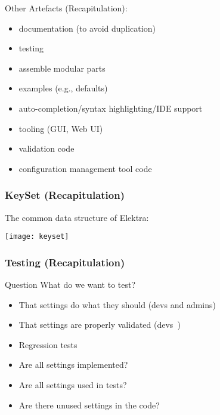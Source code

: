 \begin{frame}
	Other Artefacts (Recapitulation):

	\pause

	\begin{itemize}
	\item documentation (to avoid duplication)
	\item testing
	\item assemble modular parts
	\item examples (e.g., defaults)
	\item auto-completion/syntax highlighting/IDE support
	\item tooling (GUI, Web UI)
	\item validation code
	\item configuration management tool code
	\end{itemize}
\end{frame}

\begin{frame}
	\frametitle{KeySet (Recapitulation)}

	The common data structure of Elektra:
	\vspace{1cm}

	\texttt{[image: keyset]}
\end{frame}

\begin{frame}
	\frametitle{Testing (Recapitulation)}
	\begin{alertblock}{Question}
	What do we want to test?
	\end{alertblock}

	\pause

	\begin{itemize}
	\item That settings do what they should (devs and admins)
	\item That settings are properly validated (devs~\cite{xu2013blame})
	\item Regression tests~\cite{qu2008configuration}
	\vspace{1em}
	\item Are all settings implemented?
	\item Are all settings used in tests?
	\item Are there unused settings in the code?
	\end{itemize}
\end{frame}


